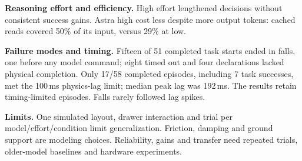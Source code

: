 \documentclass{article}
\begin{document}
\textbf{Reasoning effort and efficiency.} High effort lengthened decisions
without consistent success gains. Astra high cost less despite more output
tokens: cached reads covered 50\% of its input, versus 29\% at low.

\textbf{Failure modes and timing.} Fifteen of 51 completed task starts ended
in falls, one before any model command; eight timed out and four declarations
lacked physical completion. Only 17/58 completed episodes, including 7 task
successes, met the 100\,ms physics-lag limit; median peak lag was 192\,ms.
The results retain timing-limited episodes. Falls rarely followed lag spikes.

\textbf{Limits.} One simulated layout, drawer interaction and trial per
model/effort/condition limit generalization. Friction, damping and ground support
are modeling choices. Reliability, gains and transfer need repeated trials,
older-model baselines and hardware experiments.

\clearpage

\end{document}
